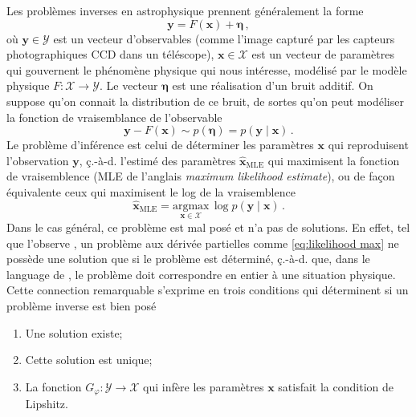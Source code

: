 Les problèmes inverses en astrophysique prennent généralement la forme
\begin{equation}\label{eq:inverse problem lineaire}
       \mathbf{y} = F(\mathbf{x}) + \boldsymbol{\eta}\, ,
\end{equation} 
où $\mathbf{y}\in \mathcal{Y}$ est un vecteur d'observables (comme l'image capturé par les capteurs photographiques CCD dans un téléscope), 
$\mathbf{x}\in\mathcal{X}$ est un vecteur de paramètres qui gouvernent le phénomène physique qui nous intéresse, 
modélisé par le modèle physique $F:\mathcal{X} \rightarrow \mathcal{Y}$.
Le vecteur $\boldsymbol{\eta}$ est une réalisation d'un bruit additif. 
On suppose qu'on connait la distribution de ce bruit, de sortes qu'on peut modéliser la fonction de vraisemblance de l'observable
\begin{equation}\label{eq:likelihood intro}
        \mathbf{y} - F(\mathbf{x}) \sim p(\boldsymbol{ \eta}) = p(\mathbf{y} \mid \mathbf{x})\, .
\end{equation} 
Le problème d'inférence est celui de déterminer les paramètres $\mathbf{x}$ qui reproduisent l'observation $\mathbf{y}$, 
ç.-à-d. l'estimé des paramètres $\hat{\mathbf{x}}_{\mathrm{MLE}}$ 
qui maximisent la fonction de vraisemblence (MLE de l'anglais \textit{maximum likelihood estimate}), 
ou de façon équivalente ceux qui maximisent le log de la vraisemblence
\begin{equation}\label{eq:likelihood max}
        \hat{\mathbf{x}}_{\mathrm{MLE}} = \underset{\mathbf{x} \in \mathcal{X}}{\mathrm{argmax}}\, \log p(\mathbf{y} \mid \mathbf{x})\, .
\end{equation} 
Dans le cas général, ce problème est mal posé et n'a pas de solutions. En effet, 
tel que l'observe \citet{Hadamard1902}, un problème aux dérivée partielles comme \eqref{eq:likelihood max} 
ne possède une solution que si le problème est déterminé, ç.-à-d. que, dans le language de \citet{Hadamard1902}, 
le problème doit correspondre en entier à une situation physique. Cette connection remarquable s'exprime en trois conditions qui déterminent 
si un problème inverse est bien posé
\begin{enumerate}[label=(\subscript{H}{{\arabic*}})]
        \item \label{hadamard:1}Une solution existe;
        \item \label{hadamard:2}Cette solution est unique;
        \item \label{hadamard:3} La fonction $G_\varphi: \mathcal{Y} \rightarrow \mathcal{X}$ 
                qui infère les paramètres $\mathbf{x}$ satisfait la condition de Lipshitz.
\end{enumerate}
